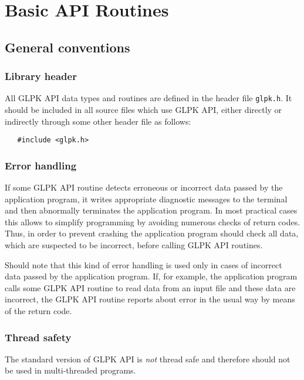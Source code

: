 
\chapter{Basic API Routines}

\section{General conventions}

\subsection{Library header}

All GLPK API data types and routines are defined in the header file
\verb|glpk.h|. It should be included in all source files which use
GLPK API, either directly or indirectly through some other header file
as follows:

\begin{verbatim}
   #include <glpk.h>
\end{verbatim}

\subsection{Error handling}

If some GLPK API routine detects erroneous or incorrect data passed by
the application program, it writes appropriate diagnostic messages to
the terminal and then abnormally terminates the application program.
In most practical cases this allows to simplify programming by avoiding
numerous checks of return codes. Thus, in order to prevent crashing the
application program should check all data, which are suspected to be
incorrect, before calling GLPK API routines.

Should note that this kind of error handling is used only in cases of
incorrect data passed by the application program. If, for example, the
application program calls some GLPK API routine to read data from an
input file and these data are incorrect, the GLPK API routine reports
about error in the usual way by means of the return code.

\subsection{Thread safety}

The standard version of GLPK API is {\it not} thread safe and therefore
should not be used in multi-threaded programs.

